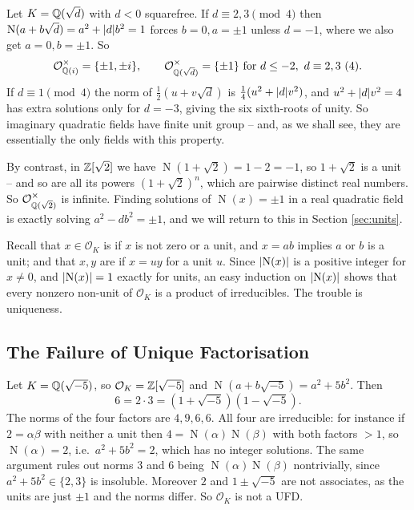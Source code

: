 \documentclass[a4paper]{scrartcl}
\renewcommand{\OO}{\mathcal{O}}
\newcommand{\Nm}{\operatorname{N}}
\begin{document}
\begin{example}\label{ex:unitsimag}
	Let $K = \mathbb{Q}(\sqrt d)$ with $d < 0$ squarefree. If $d \equiv 2,3 \pmod 4$ then $\Nm(a+b\sqrt d) = a^2 + \abs{d}b^2 = 1$ forces $b = 0, a = \pm1$ unless $d = -1$, where we also get $a = 0, b = \pm 1$. So
	$$\OO_{\Q(i)}^\times = \{\pm1,\pm i\}, \qquad \OO_{\Q(\sqrt d)}^\times = \{\pm 1\} \text{ for } d \leq -2,\ d\equiv 2,3 \ (4).$$
	If $d \equiv 1 \pmod 4$ the norm of $\tfrac12(u+v\sqrt d)$ is $\tfrac14(u^2 + \lvert d\rvert v^2)$, and $u^2 + \lvert d\rvert v^2 = 4$ has extra solutions only for $d = -3$, giving the six sixth-roots of unity. So imaginary quadratic fields have finite unit group -- and, as we shall see, they are essentially the only fields with this property.
\end{example}

\begin{example}
	By contrast, in $\mathbb{Z}[\sqrt2]$ we have $\Nm(1+\sqrt2) = 1 - 2 = -1$, so $1+\sqrt2$ is a unit -- and so are all its powers $(1+\sqrt2)^n$, which are pairwise distinct real numbers. So $\OO_{\Q(\sqrt2)}^\times$ is infinite. Finding solutions of $\Nm(x) = \pm 1$ in a real quadratic field is exactly solving  $a^2 - db^2 = \pm 1$, and we will return to this in Section \ref{sec:units}.
\end{example}

Recall that $x \in \OO_K$ is  if $x$ is not zero or a unit, and $x = ab$ implies $a$ or $b$ is a unit; and that $x, y$ are  if $x = uy$ for a unit $u$. Since $\abs{\Nm(x)}$ is a positive integer for $x \neq 0$, and $\abs{\Nm(x)} = 1$ exactly for units, an easy induction on $\abs{\Nm(x)}$ shows that every nonzero non-unit of $\OO_K$ is a product of irreducibles. The trouble is uniqueness.

\subsection{The Failure of Unique Factorisation}

\begin{example}\label{ex:fail}
	Let $K = \mathbb{Q}(\sqrt{-5})$, so $\OO_K = \Z[\sqrt{-5}]$ and $\Nm(a+b\sqrt{-5}) = a^2 + 5b^2$. Then
	$$6 = 2\cdot 3 = (1+\sqrt{-5})(1-\sqrt{-5}).$$
	The norms of the four factors are $4, 9, 6, 6$. All four are irreducible: for instance if $2 = \alpha\beta$ with neither a unit then $4 = \Nm(\alpha)\Nm(\beta)$ with both factors $> 1$, so $\Nm(\alpha) = 2$, i.e.\ $a^2+5b^2 = 2$, which has no integer solutions. The same argument rules out norms $3$ and $6$ being $\Nm(\alpha)\Nm(\beta)$ nontrivially, since $a^2+5b^2 \in \{2,3\}$ is insoluble. Moreover $2$ and $1\pm\sqrt{-5}$ are not associates, as the units are just $\pm 1$ and the norms differ. So $\OO_K$ is not a UFD.
\end{example}
\end{document}
